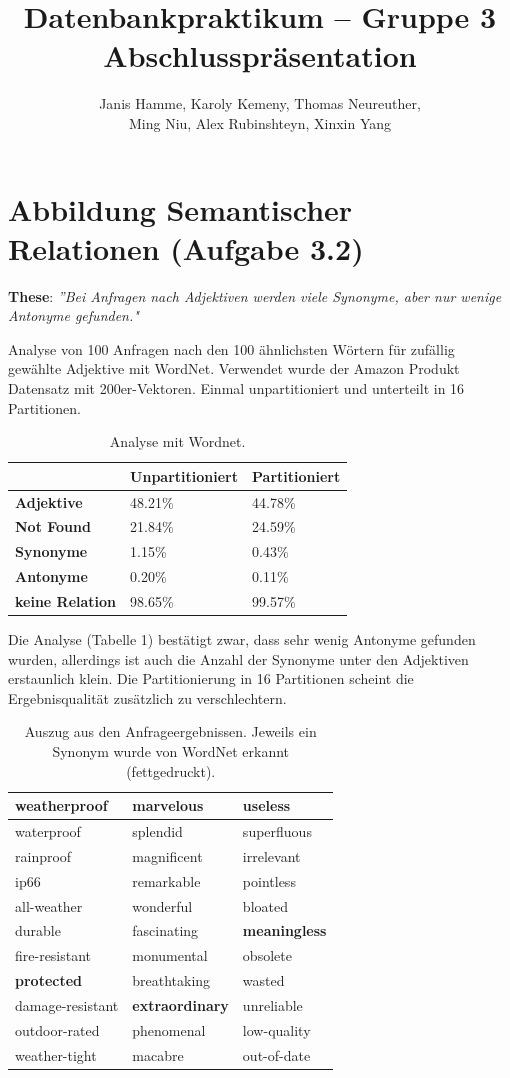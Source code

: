 \documentclass[a4paper, 11pt]{scrartcl}
\title{Datenbankpraktikum -- Gruppe 3\\ Abschlusspräsentation}
\author{Janis Hamme, Karoly Kemeny, Thomas Neureuther,\\ Ming Niu, Alex Rubinshteyn,  Xinxin Yang}
\begin{document}
\maketitle

\section{Abbildung Semantischer Relationen (Aufgabe 3.2)}

\textbf{These}: \emph{''Bei Anfragen nach Adjektiven werden viele Synonyme, aber nur wenige Antonyme gefunden."}

Analyse von 100 Anfragen nach den 100 ähnlichsten Wörtern für zufällig gewählte Adjektive mit WordNet. Verwendet wurde der Amazon Produkt Datensatz mit 200er-Vektoren. Einmal unpartitioniert und unterteilt in 16 Partitionen.

\begin{table}[h!]
\centering
\begin{tabu}{lll}
\toprule
& \textbf{Unpartitioniert} & \textbf{Partitioniert} \\
\midrule
\textbf{Adjektive}&48.21\%&44.78\% \\
\textbf{Not Found}&21.84\%&24.59\%\\
\midrule
\textbf{Synonyme}&1.15\%&0.43\% \\
\textbf{Antonyme}&0.20\%&0.11\% \\
\textbf{keine Relation}&98.65\%&99.57\% \\
\bottomrule
\end{tabu}
\caption{Analyse mit Wordnet.}
\label{tbl:asdf}
\end{table}
Die Analyse (Tabelle 1) bestätigt zwar, dass sehr wenig Antonyme gefunden wurden, allerdings ist auch die Anzahl der Synonyme unter den Adjektiven erstaunlich klein. Die Partitionierung in 16 Partitionen scheint die Ergebnisqualität zusätzlich zu verschlechtern.

\begin{table}[h!]
\centering
\begin{tabu}{lll}
\toprule
\textbf{weatherproof} & \textbf{marvelous} & \textbf{useless} \\
\midrule
waterproof&splendid&superfluous \\
rainproof&magnificent&irrelevant \\
ip66&remarkable&pointless \\
all-weather&wonderful&bloated \\
durable&fascinating&\textbf{meaningless} \\
fire-resistant&monumental&obsolete \\
\textbf{protected}&breathtaking&wasted \\
damage-resistant&\textbf{extraordinary}&unreliable \\
outdoor-rated&phenomenal&low-quality \\
weather-tight&{\color{red}macabre}&out-of-date \\

\bottomrule
\end{tabu}
\caption{Auszug aus den Anfrageergebnissen. Jeweils ein Synonym wurde von WordNet erkannt (fettgedruckt).}
\label{tbl:asdf}
\end{table}
\end{document}
